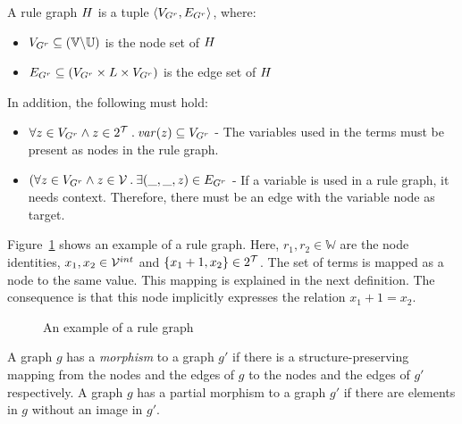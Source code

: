 \vspace{5px}
\begin{definition}
A rule graph $H$ is a tuple $\langle V_{G^r}, E_{G^r} \rangle$, where:
\begin{itemize}
  \item $V_{G^r} \subseteq (\mathbb{V} \backslash \mathbb{U})$ is the node set of $H$
  \item $E_{G^r} \subseteq (V_{G^r} \times L \times V_{G^r})$ is the edge set of $H$
\end{itemize}
In addition, the following must hold:
\begin{itemize}
\item $\forall z \in V_{G^r} \land z \in 2^{\mathcal{T}}\: .\:\mathit{var}(z) \subseteq V_{G^r}$ - The variables used in the terms must be present as nodes in the rule graph.
\item $(\forall z \in V_{G^r} \land z \in \mathcal{V}\: .\: \exists (\_, \_, z) \in E_{G^r}$ - If a variable is used in a rule graph, it needs context. Therefore, there must be an edge with the variable node as target.
\end{itemize}
\end{definition}
\vspace{5px}

Figure~\ref{fig:rulegraph_example} shows an example of a rule graph. Here, $r_1, r_2 \in \mathbb{W}$ are the node identities, $x_1,x_2 \in \mathcal{V}^{int}$ and $\{x_1+1, x_2\} \in 2^{\mathcal{T}}$. The set of terms is mapped as a node to the same value. This mapping is explained in the next definition. The consequence is that this node implicitly expresses the relation $x_1+1 = x_2$.

\begin{figure}[ht]
  \begin{center}
    
  \end{center}
  \caption{An example of a rule graph}
  \label{fig:rulegraph_example}
\end{figure}

\vspace{5px}
\begin{definition}
A graph $g$ has a \textit{morphism} to a graph $g'$ if there is a structure-preserving mapping from the nodes and the edges of $g$ to the nodes and the edges of $g'$ respectively. A graph $g$ has a partial morphism to a graph $g'$ if there are elements in $g$ without an image in $g'$.
\end{definition}
\vspace{5px}

